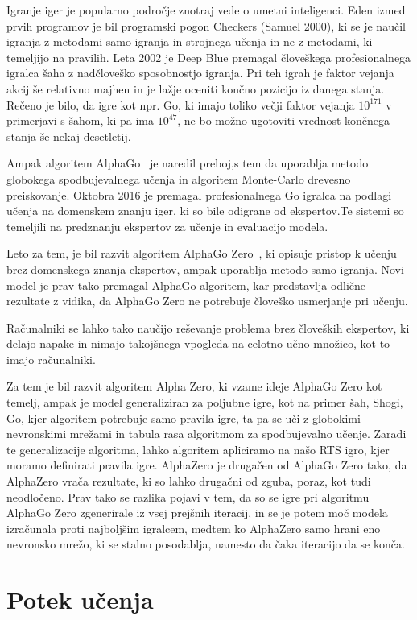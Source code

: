 \documentclass[a4paper, 12pt]{book}
\begin{document}
Igranje iger je popularno področje znotraj vede o umetni inteligenci. Eden izmed prvih programov je bil programski pogon Checkers (Samuel 2000), ki se je naučil igranja z metodami samo-igranja in strojnega učenja in ne z metodami, ki temeljijo na pravilih.
Leta 2002 je Deep Blue premagal človeškega profesionalnega igralca šaha z nadčloveško sposobnostjo igranja. Pri teh igrah je faktor vejanja akcij še relativno majhen in je lažje oceniti končno pozicijo iz danega stanja.
Rečeno je bilo, da igre kot npr. Go, ki imajo toliko večji faktor vejanja $10^{171}$ v primerjavi s šahom, ki pa ima $10^{47}$, ne bo možno ugotoviti vrednost končnega stanja še nekaj desetletij.

Ampak algoritem AlphaGo~\cite{silver2016mastering} je naredil preboj,s tem da uporablja metodo globokega spodbujevalnega učenja in algoritem Monte-Carlo drevesno preiskovanje. Oktobra 2016 je premagal profesionalnega Go igralca na podlagi učenja na domenskem znanju iger, ki so bile odigrane od ekspertov.Te sistemi so temeljili na predznanju ekspertov za učenje in evaluacijo modela.

Leto za tem, je bil razvit algoritem AlphaGo Zero~\cite{silver2017mastering}, ki opisuje pristop k učenju brez domenskega znanja ekspertov, ampak uporablja metodo samo-igranja. Novi model je prav tako premagal AlphaGo algoritem, kar predstavlja odlične rezultate z vidika, da AlphaGo Zero ne potrebuje človeško usmerjanje pri učenju.

Računalniki se lahko tako naučijo reševanje problema brez človeških ekspertov, ki delajo napake in nimajo takojšnega vpogleda na celotno učno množico, kot to imajo računalniki.

Za tem je bil razvit algoritem Alpha Zero, ki vzame ideje AlphaGo Zero kot temelj, ampak je model generaliziran za poljubne igre, kot na primer šah, Shogi, Go, kjer algoritem potrebuje samo pravila igre, ta pa se uči z globokimi nevronskimi mrežami in tabula rasa algoritmom za spodbujevalno učenje.
Zaradi te generalizacije algoritma, lahko algoritem apliciramo na našo RTS igro, kjer moramo definirati pravila igre.
AlphaZero je drugačen od AlphaGo Zero tako, da AlphaZero vrača rezultate, ki so lahko drugačni od zguba, poraz, kot tudi neodločeno.
Prav tako se razlika pojavi v tem, da so se igre pri algoritmu AlphaGo Zero zgenerirale iz vsej prejšnih iteracij, in se je potem moč modela izračunala proti najboljšim igralcem, medtem ko AlphaZero samo hrani eno nevronsko mrežo, ki se stalno posodablja, namesto da čaka iteracijo da se konča.
\section{Potek učenja}
\end{document}
